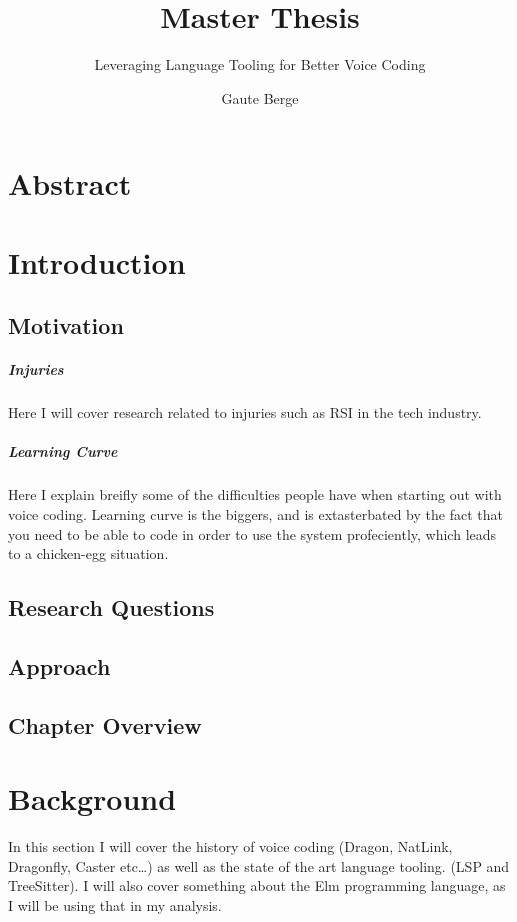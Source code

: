 \documentclass[a4paper,english]{ifimaster}
\title{Master Thesis}
\subtitle{Leveraging Language Tooling for Better Voice Coding}
\author{Gaute Berge}
\begin{document}
\duoforside[dept={Department of Informatics},
program={Informatics: Programming and System Architecture},
long]

\frontmatter{}
\chapter*{Abstract}

\tableofcontents{}
\listoffigures{}
\listoftables{}


\mainmatter{}

\chapter{Introduction}

\section{Motivation}
\paragraph{Injuries}
Here I will cover research related to injuries such as RSI in the tech industry.
\paragraph{Learning Curve}
Here I explain breifly some of the difficulties people have when starting out with voice coding.
Learning curve is the biggers, and is extasterbated by the fact that you need
to be able to code in order to use the system profeciently, which leads to a 
chicken-egg situation.

\section{Research Questions}
\section{Approach}
\section{Chapter Overview}

\chapter{Background}
In this section I will cover the history of voice coding (Dragon, NatLink, Dragonfly, Caster etc\ldots)
as well as the state of the art language tooling. (LSP and TreeSitter).
I will also cover something about the Elm programming language, as I will be using that in my analysis.
\end{document}
